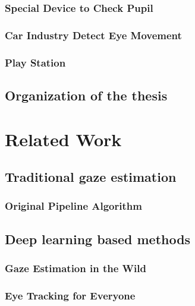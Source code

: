 \documentclass[senior]{IPSstyle}
\begin{document}
\subsection{Special Device to Check Pupil}
\subsection{Car Industry Detect Eye Movement}
\subsection{Play Station}



\section{Organization of the thesis}

\chapter{Related Work} \label{related_work}


\section{Traditional gaze estimation}
\subsection{Original Pipeline Algorithm}
\section{Deep learning based methods}
\subsection{Gaze Estimation in the Wild}
\subsection{Eye Tracking for Everyone}

\end{document}

